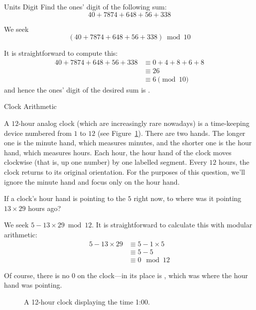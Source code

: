 \documentclass[a4paper,10pt]{report}
\begin{document}
\begin{problem}{Units Digit}
 Find the ones' digit of the following sum: \[
  40 + 7874 + 648 + 56 + 338
 \]

 \begin{solution}
  We seek \[
   (40 + 7874 + 648 + 56 + 338) \bmod 10
  \]

  It is straightforward to compute this: \begin{align*}
   40 + 7874 + 648 + 56 + 338
   &\equiv 0 + 4 + 8 + 6 + 8 \\
   &\equiv 26 \\
   &\equiv 6 \pmod {10}
  \end{align*}
  and hence the ones' digit of the desired sum is .
 \end{solution}
\end{problem}

\begin{problem}{Clock Arithmetic}

 A $12$-hour analog clock (which are increasingly rare nowadays) is a
 time-keeping device numbered from $1$ to $12$ (see Figure~\ref{ma:clock}).
 There are two hands. The longer one is the minute hand, which measures minutes,
 and the shorter one is the hour hand, which measures hours. Each hour, the hour
 hand of the clock moves clockwise (that is, up one number) by one labelled
 segment. Every $12$ hours, the clock returns to its original orientation. For
 the purposes of this question, we'll ignore the minute hand and focus only on
 the hour hand.

 If a clock's hour hand is pointing to the $5$ right now, to where was it
 pointing $13\times29$ hours ago?

 \begin{solution}
  We seek $5 - 13 \times 29 \bmod 12$. It is straightforward to calculate this
  with modular arithmetic: \begin{align*}
   5 - 13 \times 29
   &\equiv 5 - 1 \times 5 \\
   &\equiv 5 - 5 \\
   &\equiv 0 \mod {12}
  \end{align*}

  Of course, there is no $0$ on the clock---in its place is , which was
  where the hour hand was pointing.
 \end{solution}

\end{problem}

\begin{figure}
 \fgClock{}

 \caption{A 12-hour clock displaying the time 1:00.}

 \label{ma:clock}
\end{figure}
\end{document}
